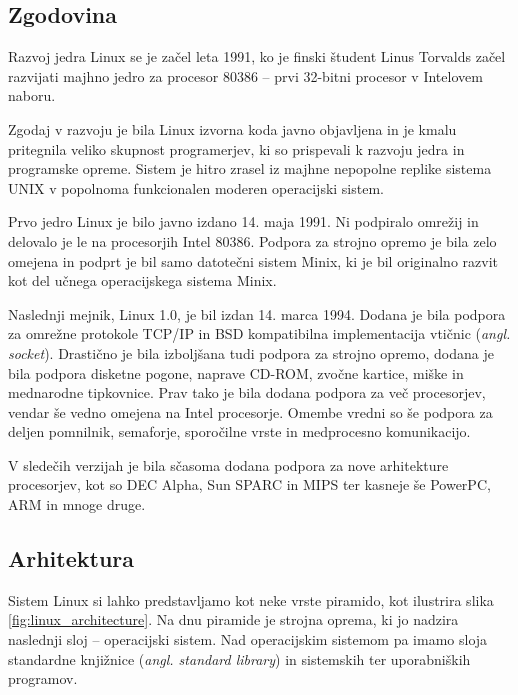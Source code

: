 \documentclass[a4paper,12pt,openright]{book}
\begin{document}
\subsection{Zgodovina}

Razvoj jedra Linux se je začel leta 1991, ko je finski študent Linus Torvalds začel razvijati majhno jedro za procesor 80386 -- prvi 32-bitni procesor v Intelovem naboru.

Zgodaj v razvoju je bila Linux izvorna koda javno objavljena in je kmalu pritegnila veliko skupnost programerjev, ki so prispevali k razvoju jedra in programske opreme.
Sistem je hitro zrasel iz majhne nepopolne replike sistema UNIX v popolnoma funkcionalen moderen operacijski sistem.

Prvo jedro Linux je bilo javno izdano 14. maja 1991. Ni podpiralo omrežij in delovalo je le na procesorjih Intel 80386.
Podpora za strojno opremo je bila zelo omejena in podprt je bil samo datotečni sistem Minix, ki je bil originalno razvit kot del učnega operacijskega sistema Minix.

Naslednji mejnik, Linux 1.0, je bil izdan 14. marca 1994. Dodana je bila podpora za omrežne protokole TCP/IP in BSD kompatibilna implementacija vtičnic (\textit{angl. socket}).
Drastično je bila izboljšana tudi podpora za strojno opremo, dodana je bila podpora disketne pogone, naprave CD-ROM, zvočne kartice, miške in mednarodne tipkovnice.
Prav tako je bila dodana podpora za več procesorjev, vendar še vedno omejena na Intel procesorje.
Omembe vredni so še podpora za deljen pomnilnik, semaforje, sporočilne vrste in medprocesno komunikacijo.

V sledečih verzijah je bila sčasoma dodana podpora za nove arhitekture procesorjev, kot so DEC Alpha, Sun SPARC in MIPS ter kasneje še PowerPC, ARM in mnoge druge.

\subsection{Arhitektura}

Sistem Linux si lahko predstavljamo kot neke vrste piramido, kot ilustrira slika \ref{fig:linux_architecture}.
Na dnu piramide je strojna oprema, ki jo nadzira naslednji sloj -- operacijski sistem.
Nad operacijskim sistemom pa imamo sloja standardne knjižnice (\textit{angl. standard library}) in sistemskih ter uporabniških programov.
\end{document}
